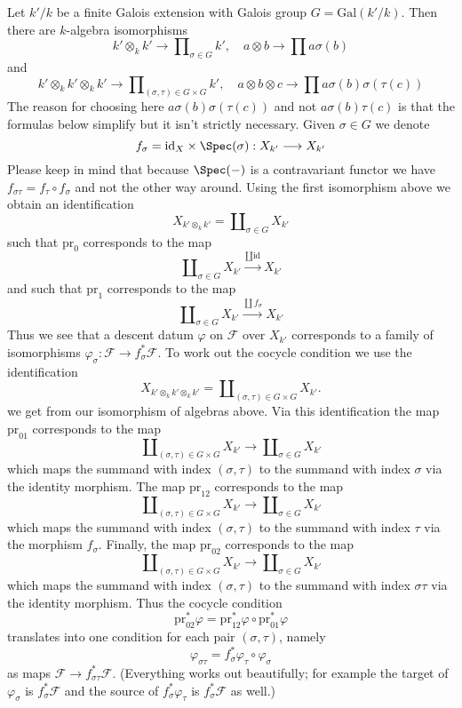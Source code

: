 \medskip\noindent
Let $k'/k$ be a finite Galois extension with Galois group
$G = \text{Gal}(k'/k)$. Then there are $k$-algebra isomorphisms
$$
k' \otimes_k k' \longrightarrow \prod\nolimits_{\sigma \in G} k',\quad
a \otimes b \longrightarrow \prod a\sigma(b)
$$
and
$$
k' \otimes_k k' \otimes_k k' \longrightarrow
\prod\nolimits_{(\sigma, \tau) \in G \times G} k',\quad
a \otimes b \otimes c \longrightarrow \prod a\sigma(b)\sigma(\tau(c))
$$
The reason for choosing here $a\sigma(b)\sigma(\tau(c))$
and not $a\sigma(b)\tau(c)$ is that the formulas below simplify but
it isn't strictly necessary. Given $\sigma \in G$ we denote
$$
f_\sigma = \text{id}_X \times \Spec(\sigma) :
X_{k'} \longrightarrow X_{k'}
$$
Please keep in mind that because $\Spec(-)$ is a contravariant functor we have
$f_{\sigma \tau} = f_\tau \circ f_\sigma$ and not the other way around.
Using the first isomorphism above we obtain an identification
$$
X_{k' \otimes_k k'} = \coprod\nolimits_{\sigma \in G} X_{k'}
$$
such that $\text{pr}_0$ corresponds to the map
$$
\coprod\nolimits_{\sigma \in G} X_{k'}
\xrightarrow{\coprod \text{id}}
X_{k'}
$$
and such that $\text{pr}_1$ corresponds to the map
$$
\coprod\nolimits_{\sigma \in G} X_{k'}
\xrightarrow{\coprod f_\sigma}
X_{k'}
$$
Thus we see that a descent datum $\varphi$ on $\mathcal{F}$ over $X_{k'}$
corresponds to a family of isomorphisms
$\varphi_\sigma : \mathcal{F} \to f_\sigma^*\mathcal{F}$.
To work out the cocycle condition we use the identification
$$
X_{k' \otimes_k k' \otimes_k k'} =
\coprod\nolimits_{(\sigma, \tau) \in G \times G} X_{k'}.
$$
we get from our isomorphism of algebras above.
Via this identification the map $\text{pr}_{01}$ corresponds to
the map
$$
\coprod\nolimits_{(\sigma, \tau) \in G \times G} X_{k'}
\longrightarrow
\coprod\nolimits_{\sigma \in G} X_{k'}
$$
which maps the summand with index $(\sigma, \tau)$ to the summand
with index $\sigma$ via the identity morphism. The map $\text{pr}_{12}$
corresponds to the map
$$
\coprod\nolimits_{(\sigma, \tau) \in G \times G} X_{k'}
\longrightarrow
\coprod\nolimits_{\sigma \in G} X_{k'}
$$
which maps the summand with index $(\sigma, \tau)$ to the summand
with index $\tau$ via the morphism $f_\sigma$. Finally, the map
$\text{pr}_{02}$ corresponds to the map
$$
\coprod\nolimits_{(\sigma, \tau) \in G \times G} X_{k'}
\longrightarrow
\coprod\nolimits_{\sigma \in G} X_{k'}
$$
which maps the summand with index $(\sigma, \tau)$ to the summand
with index $\sigma\tau$ via the identity morphism.
Thus the cocycle condition
$$
\text{pr}_{02}^*\varphi = \text{pr}_{12}^*\varphi \circ \text{pr}_{01}^*\varphi
$$
translates into one condition for each pair $(\sigma, \tau)$, namely
$$
\varphi_{\sigma\tau} = f_\sigma^*\varphi_\tau \circ \varphi_\sigma
$$
as maps $\mathcal{F} \to f_{\sigma\tau}^*\mathcal{F}$.
(Everything works out beautifully; for example the target of
$\varphi_\sigma$ is $f_\sigma^*\mathcal{F}$ and the
source of $f_\sigma^*\varphi_\tau$ is $f_\sigma^*\mathcal{F}$ as well.)

